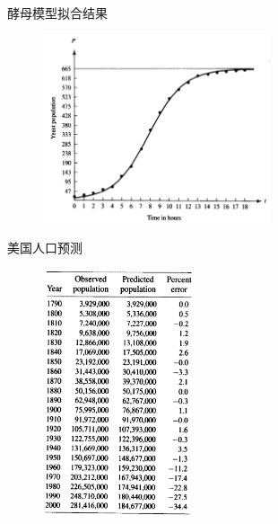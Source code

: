 \documentclass[mathserif, table]{beamer}
\begin{document}
\begin{frame}{酵母模型拟合结果}
  \begin{figure}
    \centering
    \includegraphics[width=0.6\textwidth]{yf.png}
  \end{figure}
\end{frame}

\begin{frame}{美国人口预测}
  \begin{figure}
    \centering
    \includegraphics[width=0.4\textwidth]{ap.png}
  \end{figure}
  
\end{frame}
\end{document}
